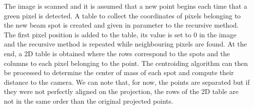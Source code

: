 The image is scanned and it is assumed that a new point begins each time that a green pixel is detected. A table to collect the coordinates of pixels belonging to the new beam spot is created and given in parameter to the recursive method. The first pixel position is added to the table, its value is set to 0 in the image and the recursive method is repeated while neighbouring pixels are found. At the end, a 2D table is obtained where the rows correspond to the spots and the columns to each pixel belonging to the point. The centroiding algorithm can then be processed to determine the center of mass of each spot and compute their distance to the camera. We can note that, for now, the points are separated but if they were not perfectly aligned on the projection, the rows of the 2D table are not in the same order than the original projected points.